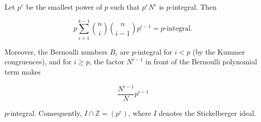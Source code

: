Let $p^e$ be the smallest power of $p$ such that $p^e N^e$ is $p$-integral. Then

$$
p \sum_{i=1}^{k-1} \binom{n}{i} \binom{n}{i-1} p^{i-1} = p\text{-integral}.
$$

Moreover, the Bernoulli numbers $B_i$ are $p$-integral for $i < p$ (by the Kummer congruences), and for $i \geq p$, the factor $N^{i-1}$ in front of the Bernoulli polynomial term makes

$$
\frac{N^{i-1}}{N} p^{i-1}
$$

$p$-integral. Consequently, $I \cap \mathbb{Z} = (p^e)$, where $I$ denotes the Stickelberger ideal.
